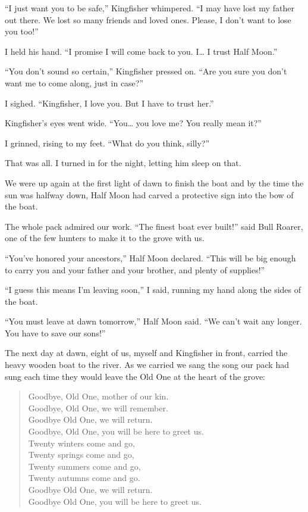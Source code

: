 ``I just want you to be safe,'' Kingfisher whimpered. ``I may have lost my father out there. We lost so many friends and loved ones. Please, I don't want to lose you too!''

I held his hand. ``I promise I will come back to you. I\ldots{} I trust Half Moon.''

``You don't sound so certain,'' Kingfisher pressed on. ``Are you sure you don't want me to come along, just in case?''

I sighed. ``Kingfisher, I love you. But I have to trust her.''

Kingfisher's eyes went wide. ``You\ldots{} you love me? You really mean it?''

I grinned, rising to my feet. ``What do you think, silly?''

That was all. I turned in for the night, letting him sleep on that.

\secdiv

\noindent We were up again at the first light of dawn to finish the boat and by the time the sun was halfway down, Half Moon had carved a protective sign into the bow of the boat.

The whole pack admired our work. ``The finest boat ever built!'' said Bull Roarer, one of the few hunters to make it to the grove with us.

``You've honored your ancestors,'' Half Moon declared. ``This will be big enough to carry you and your father and your brother, and plenty of supplies!''

``I guess this means I'm leaving soon,'' I said, running my hand along the sides of the boat.

``You must leave at dawn tomorrow,'' Half Moon said. ``We can't wait any longer. You have to save our sons!''

\secdiv

\noindent The next day at dawn, eight of us, myself and Kingfisher in front, carried the heavy wooden boat to the river. As we carried we sang the song our pack had sung each time they would leave the Old One at the heart of the grove:

\begin{verse}
Goodbye, Old One, mother of our kin. \\
Goodbye, Old One, we will remember. \\
Goodbye Old One, we will return. \\
Goodbye, Old One, you will be here to greet us. \\
Twenty winters come and go, \\
Twenty springs come and go, \\
Twenty summers come and go, \\
Twenty autumns come and go. \\
Goodbye Old One, we will return. \\
Goodbye Old One, you will be here to greet us.
\end{verse}

